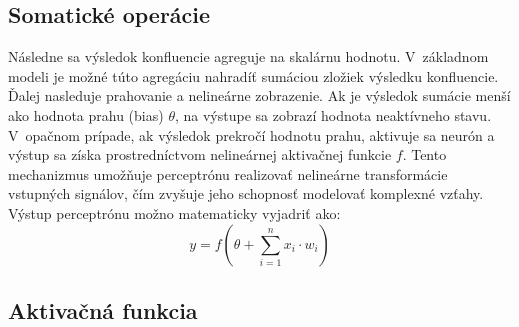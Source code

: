 \subsection*{Somatické operácie}

Následne sa výsledok konfluencie agreguje na skalárnu hodnotu. V~základnom modeli je možné túto agregáciu nahradíť sumáciou zložiek výsledku konfluencie. Ďalej nasleduje prahovanie a nelineárne zobrazenie. Ak je výsledok sumácie menší ako hodnota prahu (bias) $\theta$, na výstupe sa zobrazí hodnota neaktívneho stavu. V~opačnom prípade, ak výsledok prekročí hodnotu prahu, aktivuje sa neurón a výstup sa získa prostredníctvom nelineárnej aktivačnej funkcie $f$. Tento mechanizmus umožňuje perceptrónu realizovať nelineárne transformácie vstupných signálov, čím zvyšuje jeho schopnosť modelovať komplexné vzťahy. Výstup perceptrónu možno matematicky vyjadriť ako:
\begin{equation}
    y = f(\theta + \sum_{i=1}^{n}x_i \cdot w_i)
\end{equation}


\subsection{Aktivačná funkcia}

